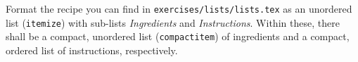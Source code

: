 Format the recipe you can find in \texttt{exercises/lists/lists.tex} as an unordered list (\texttt{itemize}) with sub-lists \emph{Ingredients} and \emph{Instructions}. 
Within these, there shall be a compact, unordered list (\texttt{compactitem}) of ingredients and a compact, ordered list of instructions, respectively.

